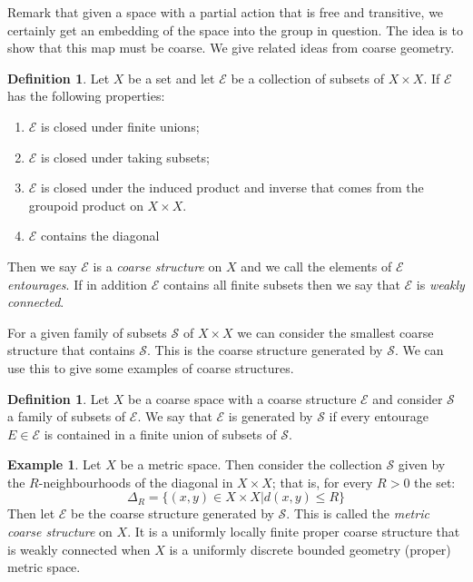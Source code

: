\documentclass[11pt,a4paper]{amsart}
\theoremstyle{plain}
\theoremstyle{definition}%
\newtheorem{definition}[theorem]{Definition}%
\newtheorem{example}[theorem]{Example}%
\theoremstyle{remark}%
\begin{document}
Remark that given a space with a partial action that is free and transitive, we certainly get an embedding of the space into the group in question. The idea is to show that this map must be coarse. We give related ideas from coarse geometry.
\begin{definition}
Let $X$ be a set and let $\mathcal{E}$ be a collection of subsets of $X \times X$. If $\mathcal{E}$ has the following properties:
\begin{enumerate}
\item $\mathcal{E}$ is closed under finite unions;
\item $\mathcal{E}$ is closed under taking subsets;
\item $\mathcal{E}$ is closed under the induced product and inverse that comes from the groupoid product on $X \times X$.
\item $\mathcal{E}$ contains the diagonal
\end{enumerate}
Then we say $\mathcal{E}$ is a \textit{coarse structure} on $X$ and we call the elements of $\mathcal{E}$ \textit{entourages}. If in addition $\mathcal{E}$ contains all finite subsets then we say that $\mathcal{E}$ is \textit{weakly connected}.
\end{definition}

For a given family of subsets $\mathcal{S}$ of $X \times X$ we can consider the smallest coarse structure that contains $\mathcal{S}$. This is the coarse structure generated by $\mathcal{S}$. We can use this to give some examples of coarse structures.

\begin{definition}
Let $X$ be a coarse space with a coarse structure $\mathcal{E}$ and consider $\mathcal{S}$ a family of subsets of $\mathcal{E}$. We say that $\mathcal{E}$ is generated by $\mathcal{S}$ if every entourage $E \in \mathcal{E}$ is contained in a finite union of subsets of $\mathcal{S}$.
\end{definition}

\begin{example}\label{ex:MCS}
Let $X$ be a metric space. Then consider the collection $\mathcal{S}$ given by the $R$-neighbourhoods of the diagonal in $X\times X$; that is, for every $R>0$ the set:
\begin{equation*}
\Delta_{R}=\lbrace (x,y) \in X \times X | d(x,y)\leq R \rbrace
\end{equation*}
Then let $\mathcal{E}$ be the coarse structure generated by $\mathcal{S}$. This is called the \textit{metric coarse structure} on $X$. It is a uniformly locally finite proper coarse structure that is weakly connected when $X$ is a uniformly discrete bounded geometry (proper) metric space.
\end{example}
\end{document}
